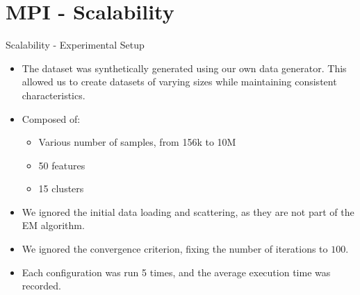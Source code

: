 \section{MPI - Scalability}

\begin{frame}{Scalability - Experimental Setup}
    \begin{itemize}
        \item The dataset was synthetically generated using our own data generator. This allowed us to create
        datasets of varying sizes while maintaining consistent characteristics.
        \item Composed of:
        \begin{itemize}
            \item Various number of samples, from 156k to 10M
            \item 50 features
            \item 15 clusters
        \end{itemize}
        \item We ignored the initial data loading and scattering, as they are not part of the EM algorithm.
        \item We ignored the convergence criterion, fixing the number of iterations to $100$.
        \item Each configuration was run 5 times, and the average execution time was recorded.
    \end{itemize}
\end{frame}

